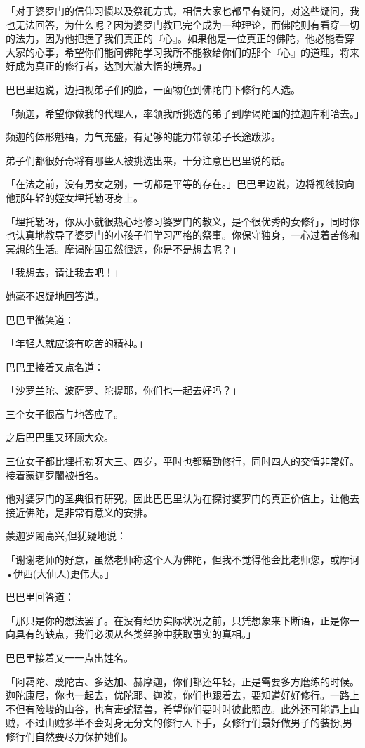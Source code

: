 \documentclass[twoside,openany]{book}
\begin{document}
「对于婆罗门的信仰习惯以及祭祀方式，相信大家也都早有疑问，对这些疑问，我也无法回答，为什么呢？因为婆罗门教已完全成为一种理论，而佛陀则有看穿一切的法力，因为他把握了我们真正的『心』。如果他是一位真正的佛陀，他必能看穿大家的心事，希望你们能问佛陀学习我所不能教给你们的那个『心』的道理，将来好成为真正的修行者，达到大澈大悟的境界。」

巴巴里边说，边扫视弟子们的脸，一面物色到佛陀门下修行的人选。

「频迦，希望你做我的代理人，率领我所挑选的弟子到摩谒陀国的拉迦库利哈去。」

频迦的体形魁梧，力气充盛，有足够的能力带领弟子长途跋涉。

弟子们都很好奇将有哪些人被挑选出来，十分注意巴巴里说的话。

「在法之前，没有男女之别，一切都是平等的存在。」巴巴里边说，边将视线投向他那年轻的姪女埋托勒呀身上。

「埋托勒呀，你从小就很热心地修习婆罗门的教义，是个很优秀的女修行，同时你也认真地教导了婆罗门的小孩子们学习严格的祭事。你保守独身，一心过着苦修和冥想的生活。摩谒陀国虽然很远，你是不是想去呢？」

「我想去，请让我去吧！」

她毫不迟疑地回答道。

巴巴里微笑道：

「年轻人就应该有吃苦的精神。」

巴巴里接着又点名道：

「沙罗兰陀、波萨罗、陀提耶，你们也一起去好吗？」

三个女子很高与地答应了。

之后巴巴里又环顾大众。

三位女子都比埋托勒呀大三、四岁，平时也都精勤修行，同时四人的交情非常好。接着蒙迦罗闍被指名。

他对婆罗门的圣典很有研究，因此巴巴里认为在探讨婆罗门的真正价值上，让他去接近佛陀，是非常有意义的安排。

蒙迦罗闍高兴,但犹疑地说：

「谢谢老师的好意，虽然老师称这个人为佛陀，但我不觉得他会比老师您，或摩诃•伊西(大仙人)更伟大。」

巴巴里回答道：

「那只是你的想法罢了。在没有经历实际状况之前，只凭想象来下断语，正是你一向具有的缺点，我们必须从各类经验中获取事实的真相。」

巴巴里接着又一一点出姓名。

「阿羁陀、蔑陀古、多达加、赫摩迦，你们都还年轻，正是需要多方磨练的时候。迦陀康尼，你也一起去，优陀耶、迦波，你们也跟着去，要知道好好修行。一路上不但有险峻的山谷，也有毒蛇猛兽，希望你们要时时彼此照应。此外还可能遇上山贼，不过山贼多半不会对身无分文的修行人下手，女修行们最好做男子的装扮,男修行们自然要尽力保护她们。
\end{document}
